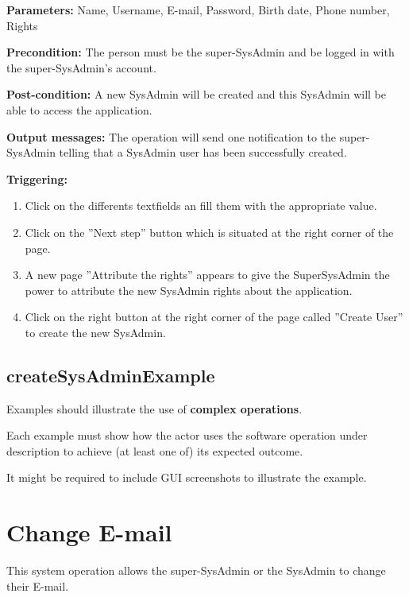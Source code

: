 \begin{description}

\item \textbf{Parameters:} Name, Username, E-mail, Password, Birth date, Phone
number, Rights
\item \textbf{Precondition:} The person must be the super-SysAdmin and be logged
in with the super-SysAdmin's account.
\item \textbf{Post-condition:} A new SysAdmin will be created and this
SysAdmin will be able to access the application.
\item \textbf{Output messages:} The operation will send one notification to the
super-SysAdmin telling that a SysAdmin user has been successfully created.


\item \textbf{Triggering:}
\begin{enumerate}
\item Click on the differents textfields an fill them with the appropriate
value.
\item Click on the ''Next step'' button which is situated at the right corner of
the page.
\item A new page ''Attribute the rights'' appears to give the SuperSysAdmin the
power to attribute the new SysAdmin rights about the application.
\item Click on the right button at the right corner of the page called
''Create User'' to create the new SysAdmin.

\end{enumerate}

 
\end{description}

 
\subsection{createSysAdminExample}
Examples should illustrate the use of \textbf{complex operations}.

Each example must show how the actor uses the software operation under
description to achieve (at least one of) its expected outcome.

It might be required to include GUI screenshots to illustrate the example.








\section{Change E-mail}
\label{operation:changeEmail}
This system operation allows the super-SysAdmin or the SysAdmin to change
their E-mail.

